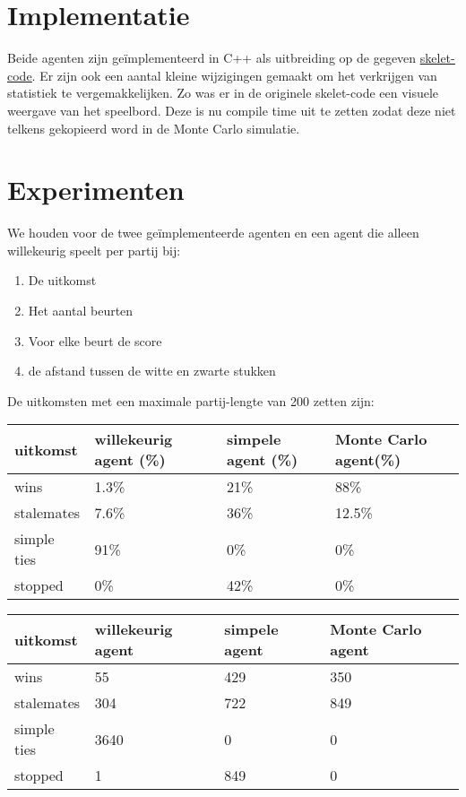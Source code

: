 \documentclass[10pt]{article}
\begin{document}
\section{Implementatie}
Beide agenten zijn geïmplementeerd in C++ als uitbreiding op de gegeven \href{http://liacs.leidenuniv.nl/~kosterswa/AI/chess.cc}{\underline{skelet-code}}. Er zijn ook een aantal kleine wijzigingen gemaakt om het verkrijgen van statistiek te vergemakkelijken. Zo was er in de originele skelet-code een visuele weergave van het speelbord. Deze is nu compile time uit te zetten zodat deze niet telkens gekopieerd word in de Monte Carlo simulatie.

\bigskip



\section{Experimenten}

We houden voor de twee geïmplementeerde agenten en een agent die alleen willekeurig speelt per partij bij:
\begin{enumerate}
\item De uitkomst
\item Het aantal beurten
\item Voor elke beurt de score
\item de afstand tussen de witte en zwarte stukken
\end{enumerate}

De uitkomsten met een maximale partij-lengte van 200 zetten zijn:
\begin{center}
\begin{tabular}{l|l|l|l}
 uitkomst & willekeurig agent (\%)& simpele agent (\%) & Monte Carlo agent(\%)\\
\hline
wins &1.3\% & 21\% & 88\%\\
stalemates &7.6\% & 36\% & 12.5\%\\
simple ties &91\% & 0\% & 0\%\\
stopped &0\% &42\% & 0\%\\
\end{tabular}
\end{center}

\begin{center}
\begin{tabular}{l|l|l|l}
 uitkomst & willekeurig agent& simpele agent & Monte Carlo agent\\
\hline
wins & 55 & 429 & 350\\
stalemates & 304 & 722 & 849\\
simple ties & 3640 & 0 & 0\\
stopped &1 &849 & 0\\
\end{tabular}
\end{center}
\end{document}
